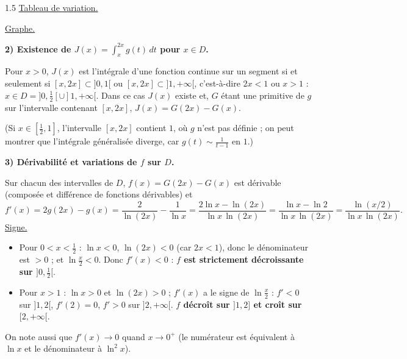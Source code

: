 \documentclass[12pt]{article}
\begin{document}
\begin{spacing}{1.5}
\underline{Tableau de variation.}
\begin{center}
\end{center}

\underline{Graphe.}
\begin{center}
\end{center}

\textbf{2) Existence de $J(x)=\displaystyle\int_x^{2x}g(t)\,dt$ pour $x\in D$.}

Pour $x>0$, $J(x)$ est l'intégrale d'une fonction continue sur un segment si et seulement si $[x,2x]\subset]0,1[$ ou $[x,2x]\subset]1,+\infty[$, c'est-à-dire $2x<1$ ou $x>1$ : $x\in D=]0,\frac12[\cup]1,+\infty[$. Dans ce cas $J(x)$ existe et, $G$ étant une primitive de $g$ sur l'intervalle contenant $[x,2x]$, $J(x)=G(2x)-G(x)$.

(Si $x\in[\frac12,1]$, l'intervalle $[x,2x]$ contient $1$, où $g$ n'est pas définie ; on peut montrer que l'intégrale généralisée diverge, car $g(t)\sim\frac1{t-1}$ en $1$.)

\textbf{3) Dérivabilité et variations de $f$ sur $D$.}

Sur chacun des intervalles de $D$, $f(x)=G(2x)-G(x)$ est dérivable (composée et différence de fonctions dérivables) et
\[
f'(x)=2g(2x)-g(x)=\frac2{\ln(2x)}-\frac1{\ln x}=\frac{2\ln x-\ln(2x)}{\ln x\,\ln(2x)}=\frac{\ln x-\ln2}{\ln x\,\ln(2x)}=\boxed{\frac{\ln(x/2)}{\ln x\,\ln(2x)}}.
\]
\underline{Signe.}
\begin{itemize}
\item Pour $0<x<\frac12$ : $\ln x<0$, $\ln(2x)<0$ (car $2x<1$), donc le dénominateur est $>0$ ; et $\ln\frac x2<0$. Donc $f'(x)<0$ : \textbf{$f$ est strictement décroissante sur $]0,\frac12[$}.
\item Pour $x>1$ : $\ln x>0$ et $\ln(2x)>0$ ; $f'(x)$ a le signe de $\ln\frac x2$ : $f'<0$ sur $]1,2[$, $f'(2)=0$, $f'>0$ sur $]2,+\infty[$. \textbf{$f$ décroît sur $]1,2]$ et croît sur $[2,+\infty[$}.
\end{itemize}
On note aussi que $f'(x)\to0$ quand $x\to0^+$ (le numérateur est équivalent à $\ln x$ et le dénominateur à $\ln^2x$).


\end{spacing}
\end{document}

